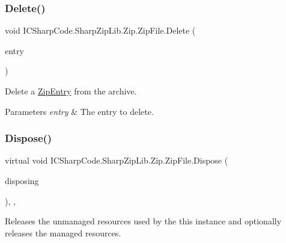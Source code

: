 \subsubsection{\texorpdfstring{Delete()}{Delete()}\hspace{0.1cm}{\footnotesize\ttfamily [2/2]}}
{\footnotesize\ttfamily void I\+C\+Sharp\+Code.\+Sharp\+Zip\+Lib.\+Zip.\+Zip\+File.\+Delete (\begin{DoxyParamCaption}\item[{\hyperlink{class_i_c_sharp_code_1_1_sharp_zip_lib_1_1_zip_1_1_zip_entry}{Zip\+Entry}}]{entry }\end{DoxyParamCaption})\hspace{0.3cm}{\ttfamily [inline]}}



Delete a \hyperlink{class_i_c_sharp_code_1_1_sharp_zip_lib_1_1_zip_1_1_zip_entry}{Zip\+Entry} from the archive. 


\begin{DoxyParams}{Parameters}
{\em entry} & The entry to delete.\\
\hline
\end{DoxyParams}
\mbox{\label{class_i_c_sharp_code_1_1_sharp_zip_lib_1_1_zip_1_1_zip_file_ade3c101c35ede840e860759d43381c62}} 
\subsubsection{\texorpdfstring{Dispose()}{Dispose()}}
{\footnotesize\ttfamily virtual void I\+C\+Sharp\+Code.\+Sharp\+Zip\+Lib.\+Zip.\+Zip\+File.\+Dispose (\begin{DoxyParamCaption}\item[{bool}]{disposing }\end{DoxyParamCaption})\hspace{0.3cm}{\ttfamily [inline]}, {\ttfamily [protected]}, {\ttfamily [virtual]}}



Releases the unmanaged resources used by the this instance and optionally releases the managed resources. 


